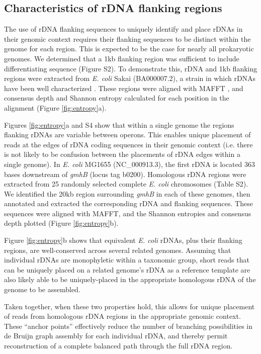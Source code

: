 \documentclass[a4,center,fleqn]{NAR}
\begin{document}
\subsection*{Characteristics of rDNA flanking regions}
The use of rDNA flanking sequences to uniquely identify and place rDNAs in their genomic context requires their flanking sequences to be distinct within the genome for each region. This is expected to be the case for nearly all prokaryotic genomes. We determined that a 1kb flanking region was sufficient to include differentiating sequence (Figure S2). To demonstrate this, rDNA and 1kb flanking regions were extracted from \textit{E. coli} Sakai \cite{Hayashi2001} (BA000007.2), a strain in which  rDNAs have been well characterized \cite{Ohnishi2000}. These regions were aligned with MAFFT \cite{Katoh2002}, and consensus depth and Shannon entropy calculated for each position in the alignment (Figure \ref{fig:entropy}a).

Figures \ref{fig:entropy}a and S4 show that within a single genome the regions flanking rDNAs are variable between operons. This enables unique placement of reads at the edges of rDNA coding sequences in their genomic context (i.e. there is not likely to be confusion between the placements of rDNA edges within a single genome).
In \textit{E. coli} MG1655 (NC\_000913.3), the first rDNA is located 363 bases downstream of \textit{gmhB} (locus tag b0200). Homologous rDNA regions were extracted from 25 randomly selected complete \textit{E. coli} chromosomes (Table S2).  We identified the 20kb region surrounding \textit{gmhB} in each of these genomes, then annotated and extracted the corresponding rDNA and flanking sequences. These sequences were aligned with MAFFT, and the Shannon entropies and consensus depth plotted (Figure \ref{fig:entropy}b).

Figure \ref{fig:entropy}b shows that equivalent \textit{E. coli} rDNAs, plus their flanking regions, are well-conserved across several related genomes. Assuming that individual rDNAs are monophyletic within a taxonomic group, short reads that can be uniquely placed on a related genome's rDNA as a reference template are also likely able to be uniquely-placed in the appropriate homologous rDNA of the genome to be assembled.

Taken together, when these two properties hold, this allows for unique placement of reads from homologous rDNA regions in the appropriate genomic context. These ``anchor points'' effectively reduce the number of branching possibilities in de Bruijn graph assembly for each individual rDNA, and thereby permit reconstruction of a complete balanced path through the full rDNA region.
\end{document}
